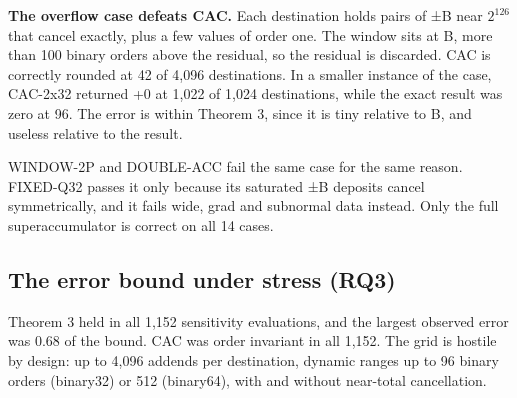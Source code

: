 \documentclass[journal]{IEEEtran}
\begin{document}
\textbf{The overflow case defeats CAC.} Each destination holds pairs of
±B near \(2^{126}\) that cancel exactly, plus a few values of order one.
The window sits at B, more than 100 binary orders above the residual, so
the residual is discarded. CAC is correctly rounded at 42 of 4,096
destinations. In a smaller instance of the case, CAC-2x32 returned +0 at
1,022 of 1,024 destinations, while the exact result was zero at 96. The
error is within Theorem 3, since it is tiny relative to B, and useless
relative to the result.

WINDOW-2P and DOUBLE-ACC fail the same case for the same reason.
FIXED-Q32 passes it only because its saturated ±B deposits cancel
symmetrically, and it fails wide, grad and subnormal data instead. Only
the full superaccumulator is correct on all 14 cases.

\hypertarget{the-error-bound-under-stress-rq3}{%
\subsection{The error bound under stress
(RQ3)}\label{the-error-bound-under-stress-rq3}}

Theorem 3 held in all 1,152 sensitivity evaluations, and the largest
observed error was 0.68 of the bound. CAC was order invariant in all
1,152. The grid is hostile by design: up to 4,096 addends per
destination, dynamic ranges up to 96 binary orders (binary32) or 512
(binary64), with and without near-total cancellation.
\end{document}
